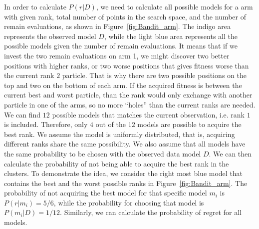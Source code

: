 In order to calculate $P(r|D)$, we need to calculate all possible models for a arm with given rank, 
total number of points in the search space, and the number of remain evaluations, 
as shown in Figure~\ref{fig:Bandit_arm}.
The indigo area represents the observed model $D$, 
while the light blue area represents all the possible models given the number of remain evaluations.
It means that if we invest the two remain evaluations on arm 1, 
we might discover two better positions with higher ranks,
or two worse positions that gives fitness worse than the current rank $2$ particle.
That is why there are two possible positions on the top and two on the bottom of each arm.
If the acquired fitness is between the current best and worst particle, 
than the rank would only exchange with another particle in one of the arms,
so no more ``holes'' than the current ranks are needed.
We can find $12$ possible models that matches the current observation, i.e. rank $1$ is included.
Therefore, only $4$ out of the $12$ models are possible to acquire the best rank.
We assume the model is uniformly distributed, that is, acquiring different ranks share the same possibility.
We also assume that all models have the same probability to be chosen with the observed data model $D$.
We can then calculate the probability of not being able to acquire the best rank in the clusters.
To demonstrate the idea, we consider the right most blue model that contains the best and the worst possible ranks in Figure~\ref{fig:Bandit_arm}.
The probability of not acquiring the best model for that specific model $m_i$ is $P(r|m_i) = 5/6$,
while the probability for choosing that model is $P(m_i|D) = 1/12$.
Similarly, we can calculate the probability of regret for all models.


